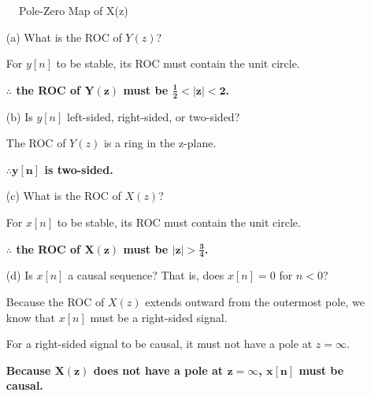\documentclass[fleqn]{article}
\begin{document}
\begin{enumerate}[nolistsep]
				\begin{figure}[H]				
				\centerline{}
				\caption{Pole-Zero Map of X(z)}
				\label{pzmap_x_z_prob_3_48}
				\end{figure}
				
				\begin{enumerate} [nolistsep]
					\item[(a)] What is the ROC of $Y(z)$?
					
						For $y[n]$ to be stable, its ROC must contain the unit circle.
						
						\textbf{$\mathbf{\therefore}$ the ROC of $\mathbf{Y(z)}$ must be $\mathbf{\frac{1}{2} < |z| < 2}$.}
						
					\item[(b)] Is $y[n]$ left-sided, right-sided, or two-sided?
					
						The ROC of $Y(z)$ is a ring in the z-plane.
						
						\textbf{$\mathbf{\therefore y[n]}$ is two-sided.}
						
					\item[(c)] What is the ROC of $X(z)$?
					
						For $x[n]$ to be stable, its ROC must contain the unit circle.
						
						\textbf{$\mathbf{\therefore}$ the ROC of $\mathbf{X(z)}$ must be $\mathbf{|z| > \frac{3}{4}}$.}
						
					\item[(d)] Is $x[n]$ a causal sequence? That is, does $x[n] = 0$ for $n < 0$?
					
						Because the ROC of $X(z)$ extends outward from the outermost pole, we know that $x[n]$ must be a right-sided signal.
						
						For a right-sided signal to be causal, it must not have a pole at $z = \infty$.
						
						\textbf{Because $\mathbf{X(z)}$ does not have a pole at $\mathbf{z = \infty}$, $\mathbf{x[n]}$ must be causal.}
				\end{enumerate}
	\end{enumerate}
	
\end{document}

